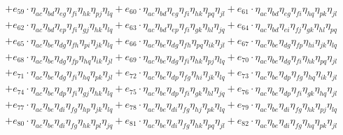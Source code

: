 \begin{itemize}
\begin{align}
    & + e_{59} \cdot \eta_{a c} \eta_{b d} \eta_{e g} \eta_{f i} \eta_{h k} \eta_{p j} \eta_{l q} + e_{60} \cdot \eta_{a c} \eta_{b d} \eta_{e g} \eta_{f i} \eta_{h k} \eta_{p q} \eta_{j l} + e_{61} \cdot \eta_{a c} \eta_{b d} \eta_{e g} \eta_{f i} \eta_{h q} \eta_{p k} \eta_{j l} \nonumber \\
    & + e_{62} \cdot \eta_{a c} \eta_{b d} \eta_{e p} \eta_{f i} \eta_{g j} \eta_{h k} \eta_{l q} + e_{63} \cdot \eta_{a c} \eta_{b d} \eta_{e p} \eta_{f i} \eta_{g k} \eta_{h l} \eta_{j q} + e_{64} \cdot \eta_{a c} \eta_{b d} \eta_{e i} \eta_{f j} \eta_{g k} \eta_{h l} \eta_{p q} \nonumber \\
    & + e_{65} \cdot \eta_{a c} \eta_{b e} \eta_{d g} \eta_{f h} \eta_{p i} \eta_{j k} \eta_{l q} + e_{66} \cdot \eta_{a c} \eta_{b e} \eta_{d g} \eta_{f h} \eta_{p q} \eta_{i k} \eta_{j l} + e_{67} \cdot \eta_{a c} \eta_{b e} \eta_{d g} \eta_{f p} \eta_{h i} \eta_{j k} \eta_{l q} \nonumber \\
    & + e_{68} \cdot \eta_{a c} \eta_{b e} \eta_{d g} \eta_{f p} \eta_{h q} \eta_{i k} \eta_{j l} + e_{69} \cdot \eta_{a c} \eta_{b e} \eta_{d g} \eta_{f i} \eta_{h k} \eta_{p j} \eta_{l q} + e_{70} \cdot \eta_{a c} \eta_{b e} \eta_{d g} \eta_{f i} \eta_{h k} \eta_{p q} \eta_{j l} \nonumber \\
    & + e_{71} \cdot \eta_{a c} \eta_{b e} \eta_{d g} \eta_{f i} \eta_{h q} \eta_{p k} \eta_{j l} + e_{72} \cdot \eta_{a c} \eta_{b e} \eta_{d p} \eta_{f g} \eta_{h i} \eta_{j k} \eta_{l q} + e_{73} \cdot \eta_{a c} \eta_{b e} \eta_{d p} \eta_{f g} \eta_{h q} \eta_{i k} \eta_{j l} \nonumber \\
    & + e_{74} \cdot \eta_{a c} \eta_{b e} \eta_{d p} \eta_{f i} \eta_{g j} \eta_{h k} \eta_{l q} + e_{75} \cdot \eta_{a c} \eta_{b e} \eta_{d p} \eta_{f i} \eta_{g k} \eta_{h l} \eta_{j q} + e_{76} \cdot \eta_{a c} \eta_{b e} \eta_{d p} \eta_{f i} \eta_{g k} \eta_{h q} \eta_{j l} \nonumber \\
    & + e_{77} \cdot \eta_{a c} \eta_{b e} \eta_{d i} \eta_{f g} \eta_{h p} \eta_{j k} \eta_{l q} + e_{78} \cdot \eta_{a c} \eta_{b e} \eta_{d i} \eta_{f g} \eta_{h j} \eta_{p k} \eta_{l q} + e_{79} \cdot \eta_{a c} \eta_{b e} \eta_{d i} \eta_{f g} \eta_{h k} \eta_{p j} \eta_{l q} \nonumber \\
    & + e_{80} \cdot \eta_{a c} \eta_{b e} \eta_{d i} \eta_{f g} \eta_{h k} \eta_{p l} \eta_{j q} + e_{81} \cdot \eta_{a c} \eta_{b e} \eta_{d i} \eta_{f g} \eta_{h k} \eta_{p q} \eta_{j l} + e_{82} \cdot \eta_{a c} \eta_{b e} \eta_{d i} \eta_{f g} \eta_{h q} \eta_{p k} \eta_{j l} \nonumber \\

\end{align}
\end{itemize}
